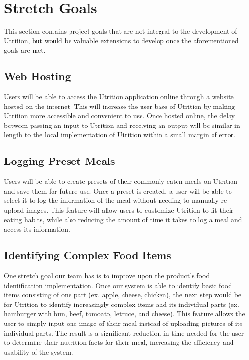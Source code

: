 \documentclass{article}
\begin{document}
\section{Stretch Goals}

This section contains project goals that are not integral to the development of Utrition, but would be valuable extensions to develop once the aforementioned goals are met.

\subsection{Web Hosting}

Users will be able to access the Utrition application online through a website hosted on the internet. This will increase the user base of Utrition by making Utrition more accessible and convenient to use. Once hosted online, the delay between passing an input to Utrition and receiving an output will be similar in length to the local implementation of Utrition within a small margin of error.

\subsection{Logging Preset Meals}

Users will be able to create presets of their commonly eaten meals on Utrition 
and save them for future use. Once a preset is created, a user will be able to 
select it to log the information of the meal without needing to manually 
re-upload images. This feature will allow users to customize Utrition to fit 
their eating habits, while also reducing the amount of time it takes to log a 
meal and access its information.

\subsection{Identifying Complex Food Items}

One stretch goal our team has is to improve upon the product's food identification implementation. Once our system is able to identify basic food items consisting of one part (ex. apple, cheese, chicken), the next step would be for Utrition to identify increasingly complex items and its individual parts (ex. hamburger with bun, beef, tomoato, lettuce, and cheese). This feature allows the user to simply input one image of their meal instead of uploading pictures of its individual parts. The result is a significant reduction in time needed for the user to determine their nutrition facts for their meal, increasing the efficiency and usability of the system.
\end{document}
